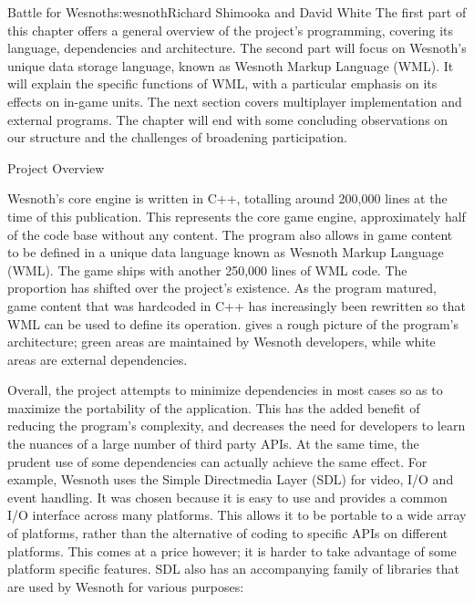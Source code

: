 \begin{aosachapter}{Battle for Wesnoth}{s:wesnoth}{Richard Shimooka and David White}
The first part of this chapter offers a general overview of the
project's programming, covering its language, dependencies and
architecture. The second part will focus on Wesnoth's unique data
storage language, known as Wesnoth Markup Language (WML). It will
explain the specific functions of WML, with a particular emphasis on
its effects on in-game units. The next section covers multiplayer
implementation and external programs.  The chapter will end with some
concluding observations on our structure and the challenges of
broadening participation.

\begin{aosasect1}{Project Overview}

Wesnoth's core engine is written in C++, totalling around 200,000 lines
at the time of this publication. This represents the core game engine,
approximately half of the code base without any content.  The program
also allows in game content to be defined in a unique data language
known as Wesnoth Markup Language (WML). The game ships with another
250,000 lines of WML code. The proportion has shifted over the
project's existence. As the program matured, game content that was
hardcoded in C++ has increasingly been rewritten so that WML can
be used to define its operation.  gives a
rough picture of the program's architecture; green areas are
maintained by Wesnoth developers, while white areas are external
dependencies.


Overall, the project attempts to minimize dependencies in most cases
so as to maximize the portability of the application. This has the
added benefit of reducing the program's complexity, and decreases the
need for developers to learn the nuances of a large number of third
party APIs.  At the same time, the prudent use of some dependencies
can actually achieve the same effect. For example, Wesnoth uses the
Simple Directmedia Layer (SDL) for video, I/O and event handling. It
was chosen because it is easy to use and provides a common I/O
interface across many platforms.  This allows it to be portable to a
wide array of platforms, rather than the alternative of coding to
specific APIs on different platforms. This comes at a price however;
it is harder to take advantage of some platform specific features. SDL
also has an accompanying family of libraries that are used by Wesnoth
for various purposes:

\begin{aosaitemize}


\end{aosaitemize}
\end{aosasect1}
\end{aosachapter}
